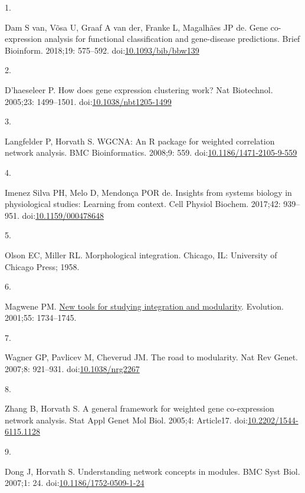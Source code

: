 \documentclass[
]{article}
\newlength{\cslhangindent}
\newlength{\csllabelwidth}
\newenvironment{CSLReferences}[2] %
 {\begin{list}{}{%
  \setlength{\itemindent}{0pt}
  \setlength{\leftmargin}{0pt}
  \setlength{\parsep}{0pt}
  \ifodd #1
   \setlength{\leftmargin}{\cslhangindent}
   \setlength{\itemindent}{-1\cslhangindent}
  \fi
  \setlength{\itemsep}{#2\baselineskip}}}
 {\end{list}}
\newcommand{\CSLLeftMargin}[1]{\parbox[t]{\csllabelwidth}{\strut#1\strut}}
\newcommand{\CSLRightInline}[1]{\parbox[t]{\linewidth - \csllabelwidth}{\strut#1\strut}}
\begin{document}
\label{refs}
\begin{CSLReferences}{0}{1}
\CSLLeftMargin{1. }%
\CSLRightInline{Dam S van, Võsa U, Graaf A van der, Franke L, Magalhães
JP de. Gene co-expression analysis for functional classification and
gene-disease predictions. Brief Bioinform. 2018;19: 575--592.
doi:\href{https://doi.org/10.1093/bib/bbw139}{10.1093/bib/bbw139}}

\CSLLeftMargin{2. }%
\CSLRightInline{D'haeseleer P. How does gene expression clustering work?
Nat Biotechnol. 2005;23: 1499--1501.
doi:\href{https://doi.org/10.1038/nbt1205-1499}{10.1038/nbt1205-1499}}

\CSLLeftMargin{3. }%
\CSLRightInline{Langfelder P, Horvath S. {WGCNA}: An {R} package for
weighted correlation network analysis. BMC Bioinformatics. 2008;9: 559.
doi:\href{https://doi.org/10.1186/1471-2105-9-559}{10.1186/1471-2105-9-559}}

\CSLLeftMargin{4. }%
\CSLRightInline{Imenez Silva PH, Melo D, Mendonça POR de. Insights from
systems biology in physiological studies: Learning from context. Cell
Physiol Biochem. 2017;42: 939--951.
doi:\href{https://doi.org/10.1159/000478648}{10.1159/000478648}}

\CSLLeftMargin{5. }%
\CSLRightInline{Olson EC, Miller RL. Morphological integration. Chicago,
IL: University of Chicago Press; 1958. }

\CSLLeftMargin{6. }%
\CSLRightInline{Magwene PM.
\href{https://www.ncbi.nlm.nih.gov/pubmed/11681729}{New tools for
studying integration and modularity}. Evolution. 2001;55: 1734--1745. }

\CSLLeftMargin{7. }%
\CSLRightInline{Wagner GP, Pavlicev M, Cheverud JM. {The road to
modularity}. Nat Rev Genet. 2007;8: 921--931.
doi:\href{https://doi.org/10.1038/nrg2267}{10.1038/nrg2267}}

\CSLLeftMargin{8. }%
\CSLRightInline{Zhang B, Horvath S. A general framework for weighted
gene co-expression network analysis. Stat Appl Genet Mol Biol. 2005;4:
Article17.
doi:\href{https://doi.org/10.2202/1544-6115.1128}{10.2202/1544-6115.1128}}

\CSLLeftMargin{9. }%
\CSLRightInline{Dong J, Horvath S. Understanding network concepts in
modules. BMC Syst Biol. 2007;1: 24.
doi:\href{https://doi.org/10.1186/1752-0509-1-24}{10.1186/1752-0509-1-24}}


\end{CSLReferences}
\end{document}

